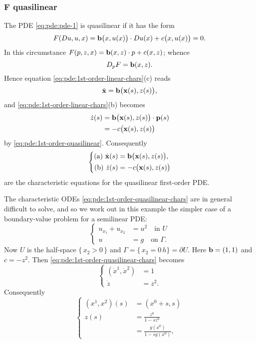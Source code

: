\subsubsection[\(F\) quasilinear]{\(\bm F\)  quasilinear}
The PDE \eqref{eq:pde:pde-1} is quasilinear if it has the form
\begin{equation}
  \label{eq:pde:1st-order-quasilinear}
  F(Du,u,x)=\mathbf{b}\bigl(x,u(x)\bigr)\cdot Du(x)+c\bigl(x,u(x)\bigr)=0.
\end{equation}
In this circumstance \(F(p,z,x)=\mathbf{b}(x,z)\cdot p+c(x,z)\); whence
\[
  D_pF=\mathbf{b}(x,z).
\]
Hence equation \eqref{eq:pde:1st-order-linear-chars}(c) reads
\[
  \dot{\mathbf{x}}=\mathbf{b}\bigl( \mathbf{x}(s),z(s) \bigr),
\]
and \eqref{eq:pde:1st-order-linear-chars}(b) becomes
\begin{align*}
  \dot z(s)&=\mathbf{b}\bigl(\mathbf{x}(s),z(s)\bigr)\cdot\mathbf{p}(s)\\
           &=-c\bigl(\mathbf{x}(s),z(s)\bigr)
\end{align*}
by \eqref{eq:pde:1st-order-quasilinear}. Consequently
\begin{equation}
  \label{eq:pde:1st-order-quasilinear-chars}
  \left\{
    \begin{aligned}
      \text{(a) } \dot{\mathbf{x}}(s)&=\mathbf{b}\bigl( \mathbf{x}(s),z(s) \bigr),\\
      \text{(b) } \dot z(s)&=-c\bigl( \mathbf{x}(s),z(s) \bigr)
    \end{aligned}
  \right.
\end{equation}
are the characteristic equations for the quasilinear first-order PDE.

\begin{example}
  The characteristic ODEs \eqref{eq:pde:1st-order-quasilinear-chars} are in
  general difficult to solve, and so we work out in this example the
  simpler case of a boundary-value problem for a semilinear PDE:
  \begin{equation}
    \label{eq:pde:quasilinear-ex-2}
    \left\{
      \begin{aligned}
        u_{x_1}+u_{x_2}&=u^2\quad\text{in \(U\)}\\
        u&=g\quad\text{on \(\Gamma\).}
      \end{aligned}
    \right.
  \end{equation}
  Now \(U\) is the half-space \(\{\,x_2>0\,\}\) and
  \(\Gamma=\{\,x_2=0\,h\}=\partial U\). Here \(\mathbf{b}=(1,1)\) and
  \(c=-z^2\). Then \eqref{eq:pde:1st-order-quasilinear-chars} becomes
  \[
    \left\{
      \begin{aligned}
        (\dot{x}^1,\dot{x}^2)&=1\\
        \dot z&=z^2.
      \end{aligned}
    \right.
  \]
  Consequently
  \[
    \left\{
    \begin{aligned}
      (x^1,x^2)(s)&=(x^0+s,s)\\
      z(s)&=\displaystyle\frac{z^0}{1-sz^0}\\
      &=\displaystyle\frac{g(x^0)}{1-sg(x^0)},
    \end{aligned}
    \right.
  \]
\end{example}

